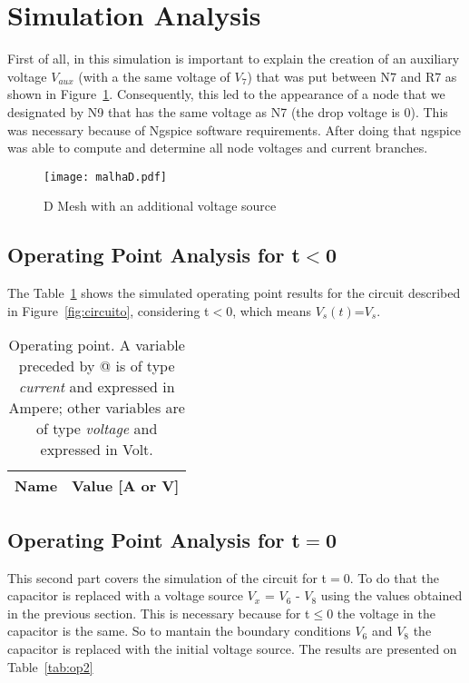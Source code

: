 \section{Simulation Analysis}

\label{sec:simulation}
First of all, in this simulation is important to explain the creation of an auxiliary voltage $V_{aux}$ (with a the same voltage of $V_{7}$) that was put between N7 and R7 as shown in Figure~\ref{fig:malhaD}. Consequently, this led to the appearance of a node that we designated by N9 that has the same voltage as N7 (the drop voltage is 0). This was necessary because of Ngspice software requirements. After doing that ngspice was able to compute and determine all node voltages and current branches.

\begin{figure}[!ht] \centering
\texttt{[image: malhaD.pdf]}
\caption{D Mesh with an additional voltage source} 
\label{fig:malhaD}
\end{figure}


\subsection{Operating Point Analysis for t$<$0}

The Table~\ref{tab:op1} shows the simulated operating point results for the circuit described in Figure~\ref{fig:circuito}, considering t$<$0, which means $V_{s}(t)$=$V_{s}$.

\begin{table}[!ht]
  \centering
  \begin{tabular}{|l|r|}
    \hline    
    {\bf Name} & {\bf Value [A or V]} \\ \hline
    
  \end{tabular}
  \caption{Operating point. A variable preceded by @ is of type {\em current}
    and expressed in Ampere; other variables are of type {\it voltage} and expressed in
    Volt.}
  \label{tab:op1}
\end{table}

\subsection{Operating Point Analysis for t$=$0}

This second part covers the simulation of the circuit for t$=$0. To do that the capacitor is replaced with a voltage source $V_{x}$ = $V_{6}$ - $V_{8}$ using the values obtained in the previous section. This is necessary because for t$\leq$0 the voltage in the capacitor is the same. So to mantain the boundary conditions $V_{6}$ and $V_{8}$ the capacitor is replaced with the initial voltage source.
The results are presented on Table~\ref{tab:op2}
 
